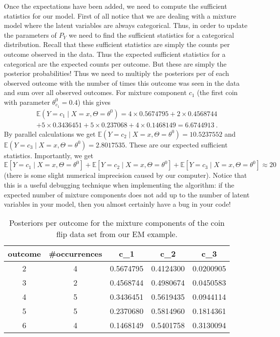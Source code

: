 \documentclass[a4paper,11pt,leqno]{report}\usepackage[]{graphicx}\usepackage[]{color}
\newcommand{\E}{\mathbb{E}}
\begin{document}
Once the expectations have been added, we need to compute the sufficient statistics for our model. First of all notice that we are dealing with
a mixture model where the latent variables are always categorical. Thus, in order to update the parameters of $ P_{Y} $ we need to find the
sufficient statistics for a categorical distribution. Recall that these sufficient statistics are simply the counts per outcome observed in
the data. Thus the expected sufficient statistics for a categorical are the expected counts per outcome. But these are simply the posterior
probabilities! Thus we need to multiply the posteriors per of each observed outcome with the number of times this outcome was
seen in the data and sum over all observed outcomes. For mixture component $ c_{1} $ (the first coin with parameter $ \theta^{0}_{c_{1}} = 0.4 $) this gives
\begin{align}
\E(Y = c_{1} \mid X=x,\Theta= \theta^{0}) = 4 \times 0.5674795 + 2 \times 0.4568744 \label{eq:c1Expectation} \\ 
+ 5 \times 0.3436451 + 5 \times 0.237068 + 4 \times 0.1468149 = 6.6744913 \nonumber \ .
\end{align}
By parallel calculations we get $ \E(Y = c_{2}\mid X=x,\Theta= \theta^{0}) = 10.5237552 $ and $ \E(Y = c_{3}\mid X=x,\Theta= \theta^{0}) = 
2.8017535 $. 
These are our expected sufficient statistics. Importantly, we get 
$ \E[Y = c_{1}\mid X=x,\Theta= \theta^{0}] + \E[Y = c_{2}\mid X=x,\Theta= \theta^{0}] + \E[Y = c_{3}\mid X=x,\Theta= \theta^{0}] \approx 20 $ (there is some slight numerical imprecision
caused by our computer). Notice that this is a useful debugging technique when implementing the algorithm: if the expected number of mixture components
does not add up to the number of latent variables in your model, then you almost certainly have a bug in your code!
\begin{table}
\center

\begin{tabular}{c|c|c|c|c}
\hline
outcome & \#occurrences & c\_1 & c\_2 & c\_3\\
\hline
2 & 4 & 0.5674795 & 0.4124300 & 0.0200905\\
\hline
3 & 2 & 0.4568744 & 0.4980674 & 0.0450583\\
\hline
4 & 5 & 0.3436451 & 0.5619435 & 0.0944114\\
\hline
5 & 5 & 0.2370680 & 0.5814960 & 0.1814361\\
\hline
6 & 4 & 0.1468149 & 0.5401758 & 0.3130094\\
\hline
\end{tabular}


\caption{Posteriors per outcome for the mixture components of the coin flip data set from our EM example.}
\label{tab:posteriors}
\end{table}
\end{document}
